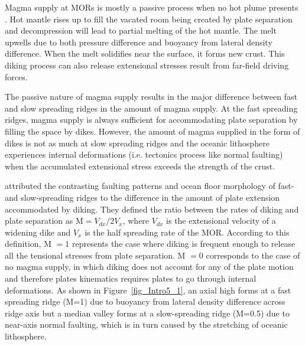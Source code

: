 Magma supply at MORs is mostly a passive process when no hot plume presents \citep{Fowler2004}. Hot mantle rises up to fill the vacated room being created by plate separation and decompression will lead to partial melting of the hot mantle. The melt upwells due to both pressure difference and buoyancy from lateral density difference. When the melt solidifies near the surface, it forms new crust. This diking process can also release extensional stresses result from far-field driving forces.

The passive nature of magma supply results in the major difference between fast and slow spreading ridges in the amount of magma supply. At the fast spreading ridges, magma supply is always sufficient for accommodating plate separation by filling the space by dikes. However, the amount of magma supplied in the form of dikes is not as much at slow spreading ridges and the oceanic lithosphere experiences internal deformations (i.e. tectonics process like normal faulting) when the accumulated extensional stress exceeds the strength of the crust. 

\citet{Buck2005} attributed the contrasting faulting patterns and ocean floor morphology of fast- and slow-spreading ridges to the difference in the amount of plate extension accommodated by diking. They defined the ratio between the rates of diking and plate separation as M$=V_{dx}/2V_{x}$, where $V_{dx}$ is the extensional velocity of a widening dike and $V_{x}$ is the half spreading rate of the MOR. According to this definition, M $=1$ represents the case where diking is frequent enough to release all the tensional stresses from plate separation. M $=0$ corresponds to the case of no magma supply, in which diking does not account for any of the plate motion and therefore plates kinematics requires plates to go through internal deformations. As shown in Figure~\ref{fig_Intro5_1}, an axial high forms at a fast spreading ridge (M=1) due to buoyancy from lateral density difference across ridge axis but a median valley forms at a slow-spreading ridge (M=0.5) due to near-axis normal faulting, which is in turn caused by the stretching of oceanic lithosphere.



